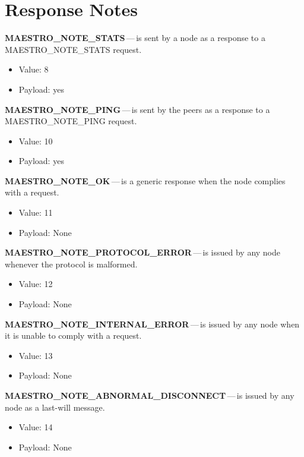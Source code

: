 \section*{Response Notes}
\begin{description}
  \setlength\itemsep{0em}
  \item \textbf{MAESTRO\_NOTE\_STATS}\,---\,is sent by a node as a response to a MAESTRO\_NOTE\_STATS request.
  \begin{itemize}
    \setlength\itemsep{0em}
    \item Value: 8
    \item Payload: yes
  \end{itemize}
  \item \textbf{MAESTRO\_NOTE\_PING}\,---\,is sent by the peers as a response to a MAESTRO\_NOTE\_PING request.
  \begin{itemize}
    \setlength\itemsep{0em}
    \item Value: 10
    \item Payload: yes
  \end{itemize}
  \item \textbf{MAESTRO\_NOTE\_OK}\,---\,is a generic response when the node complies with a request.
  \begin{itemize}
    \setlength\itemsep{0em}
    \item Value: 11
    \item Payload: None
  \end{itemize}
  \item \textbf{MAESTRO\_NOTE\_PROTOCOL\_ERROR}\,---\,is issued by any node whenever the protocol is malformed.
  \begin{itemize}
    \setlength\itemsep{0em}
    \item Value: 12
    \item Payload: None
  \end{itemize}
  \item \textbf{MAESTRO\_NOTE\_INTERNAL\_ERROR}\,---\,is issued by any node when it is unable to comply with a request.
  \begin{itemize}
    \setlength\itemsep{0em}
    \item Value: 13
    \item Payload: None
  \end{itemize}
  \item \textbf{MAESTRO\_NOTE\_ABNORMAL\_DISCONNECT}\,---\,is issued by any node as a last-will message.
  \begin{itemize}
    \setlength\itemsep{0em}
    \item Value: 14
    \item Payload: None
  \end{itemize}
\end{description}


